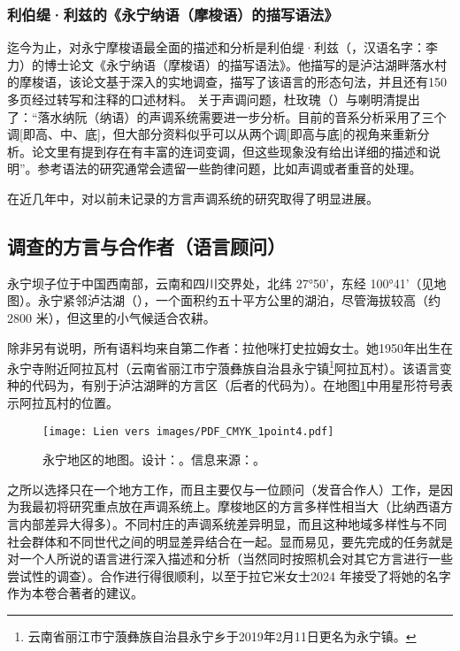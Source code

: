 \subsubsection{利伯缇·利兹的《{永宁纳}语（摩梭语）的描写语法》\parencite{lidz2010}}
\label{sec:lidz2010}
迄今为止，对永宁摩梭语最全面的描述和分析是利伯缇·利兹（，汉语名字：李力）的博士论文\parencite{lidz2010}《{永宁纳}语（摩梭语）的描写语法》。他描写的是泸沽湖畔落水村的摩梭语，该论文基于深入的实地调查，描写了该语言的形态句法，并且还有150多页经过转写和注释的口述材料。
关于声调问题，杜玫瑰（）与喇明清提出了：“落水纳阮（纳语）的声调系统需要进一步分析。目前的音系分析采用了三个调[即高、中、底]，但大部分资料似乎可以从两个调[即高与底]的视角来重新分析。论文里有提到{存在}有丰富的连词变调，但这些现象没有给出详细的描述和说明”\parencite{dobbsetal2016}。参考语法的研究通常会遗留一些韵律问题，比如声调或者重音的处理\parencite[26]{zeitoun2007}。

在近几年中，对以前未记录的方言声调系统的研究取得了明显进展\parencite{a2016,dobbsetal2016,fily_documentation_2022}。

\subsection{调查的方言与合作者（语言顾问）}

永宁坝子位于中国西南部，云南和四川交界处，北纬 27°50'，东经 100°41'（见地图）。永宁紧邻泸沽湖（），一个面积约五十平方公里的湖泊，尽管海拔较高（约 2800 米），但这里的小气候适合农耕。

除非另有说明，所有语料均来自第二作者：拉他咪打史拉姆女士。她1950年出生在永宁寺附近阿拉瓦村（云南省丽江市宁蒗彝族自治县永宁镇\footnote{云南省丽江市宁蒗彝族自治县永宁乡于2019年2月11日更名为永宁镇。}阿拉瓦村）。该语言变种的代码为，有别于泸沽湖畔的方言区（后者的代码为）。在地图\ref{map:1-1}中用星形符号表示阿拉瓦村的位置。

\begin{figure}
	\centering
	\caption{永宁地区的地图。设计：。信息来源：。}
	\texttt{[image: Lien vers images/PDF\_CMYK\_1point4.pdf]}
	\label{map:1-1}
\end{figure}

之所以选择只在一个地方工作，而且主要仅与一位顾问（发音合作人）工作，是因为我最初将研究重点放在声调系统上。摩梭地区的方言多样性相当大（比纳西语方言内部差异大得多）。不同村庄的声调系统差异明显，而且这种地域多样性与不同社会群体和不同世代之间的明显差异结合在一起。显而易见，要先完成的任务就是对一个人所说的语言进行深入描述和分析（当然同时按照机会对其它方言进行一些尝试性的调查）。合作进行得很顺利，以至于拉它米女士2024 年接受了将她的名字作为本卷合著者的建议。


